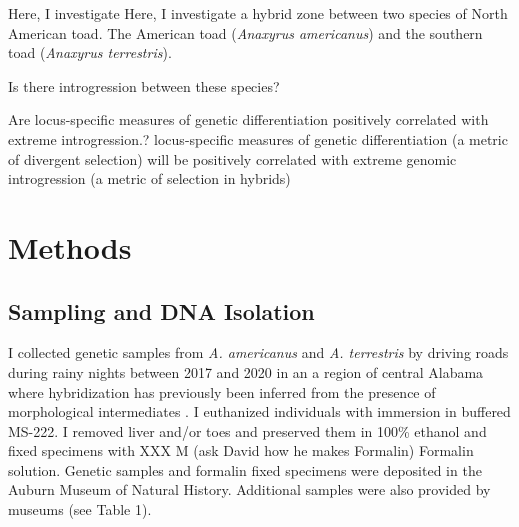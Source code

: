 Here, I investigate 
Here, I investigate a hybrid zone between two species of North American toad.
The American toad (\textit{Anaxyrus americanus}) and the southern toad 
(\textit{Anaxyrus terrestris}). 

Is there introgression between these species?

Are locus-specific measures of genetic differentiation positively correlated
with extreme introgression.?
locus-specific measures of genetic differentiation (a metric of divergent selection) 
will be positively correlated with extreme genomic introgression (a metric of selection in hybrids)


\section{Methods}
\subsection{Sampling and DNA Isolation}
I collected genetic samples from \textit{A. americanus} and \textit{A. terrestris}
by driving roads during rainy nights between 2017 and 2020
in an a region of central Alabama where hybridization has previously been
inferred from the presence of morphological intermediates \parencite{weatherby1982}. 
I euthanized individuals with immersion in buffered MS-222.
I removed liver and/or toes and preserved them in 100\% ethanol and fixed 
specimens with XXX M (ask David how he makes Formalin) Formalin solution.
Genetic samples and formalin fixed specimens were deposited in the Auburn Museum of Natural History.
Additional samples were also provided by museums (see Table 1).

